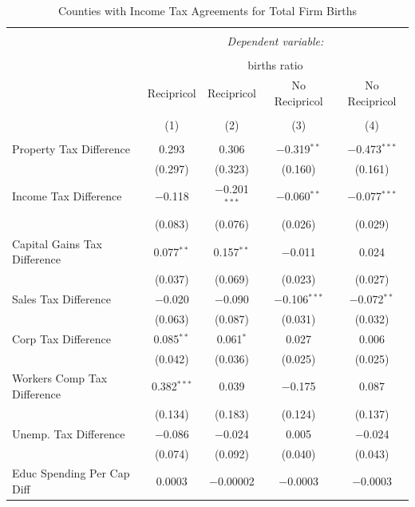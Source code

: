 \documentclass[12pt,a4paper]{article}
\begin{document}
\begin{table}[!htbp] \centering 
  \caption{Counties with Income Tax Agreements for  Total Firm Births} 
  \label{--agreement} 
\begin{tabular}{@{\extracolsep{5pt}}lcccc} 
\\[-1.8ex]\hline 
\hline \\[-1.8ex] 
 & \multicolumn{4}{c}{\textit{Dependent variable:}} \\ 
\cline{2-5} 
\\[-1.8ex] & \multicolumn{4}{c}{births ratio} \\ 
 & Recipricol & Recipricol & No Recipricol & No Recipricol \\ 
\\[-1.8ex] & (1) & (2) & (3) & (4)\\ 
\hline \\[-1.8ex] 
 Property Tax Difference & 0.293 & 0.306 & $-$0.319$^{**}$ & $-$0.473$^{***}$ \\ 
  & (0.297) & (0.323) & (0.160) & (0.161) \\ 
  Income Tax Difference & $-$0.118 & $-$0.201$^{***}$ & $-$0.060$^{**}$ & $-$0.077$^{***}$ \\ 
  & (0.083) & (0.076) & (0.026) & (0.029) \\ 
  Capital Gains Tax Difference & 0.077$^{**}$ & 0.157$^{**}$ & $-$0.011 & 0.024 \\ 
  & (0.037) & (0.069) & (0.023) & (0.027) \\ 
  Sales Tax Difference & $-$0.020 & $-$0.090 & $-$0.106$^{***}$ & $-$0.072$^{**}$ \\ 
  & (0.063) & (0.087) & (0.031) & (0.032) \\ 
  Corp Tax Difference & 0.085$^{**}$ & 0.061$^{*}$ & 0.027 & 0.006 \\ 
  & (0.042) & (0.036) & (0.025) & (0.025) \\ 
  Workers Comp Tax Difference & 0.382$^{***}$ & 0.039 & $-$0.175 & 0.087 \\ 
  & (0.134) & (0.183) & (0.124) & (0.137) \\ 
  Unemp. Tax Difference & $-$0.086 & $-$0.024 & 0.005 & $-$0.024 \\ 
  & (0.074) & (0.092) & (0.040) & (0.043) \\ 
  Educ Spending Per Cap Diff & 0.0003 & $-$0.00002 & $-$0.0003 & $-$0.0003 \\ 

\end{tabular}
\end{table}
\end{document}
